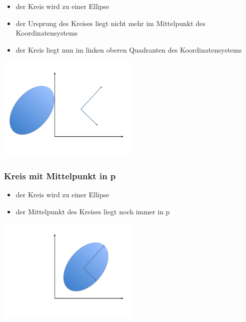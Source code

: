 \documentclass[12pt]{scrreprt}
\begin{document}
\begin{itemize}
  \item der Kreis wird zu einer Ellipse
  \item der Ursprung des Kreises liegt nicht mehr im Mittelpunkt des
Koordinatensystems
  \item der Kreis liegt nun im linken oberen Quadranten des Koordinatensystems
\end{itemize}

\begin{center}
        \includegraphics[width=0.5\textwidth]{rotation1}
\end{center}

\subsubsection*{Kreis mit Mittelpunkt in p}

\begin{itemize}
  \item der Kreis wird zu einer Ellipse
  \item der Mittelpunkt des Kreises liegt noch immer in p
\end{itemize}

\begin{center}
        \includegraphics[width=0.5\textwidth]{rotation2}
\end{center}

\pagebreak[4]
\end{document}
